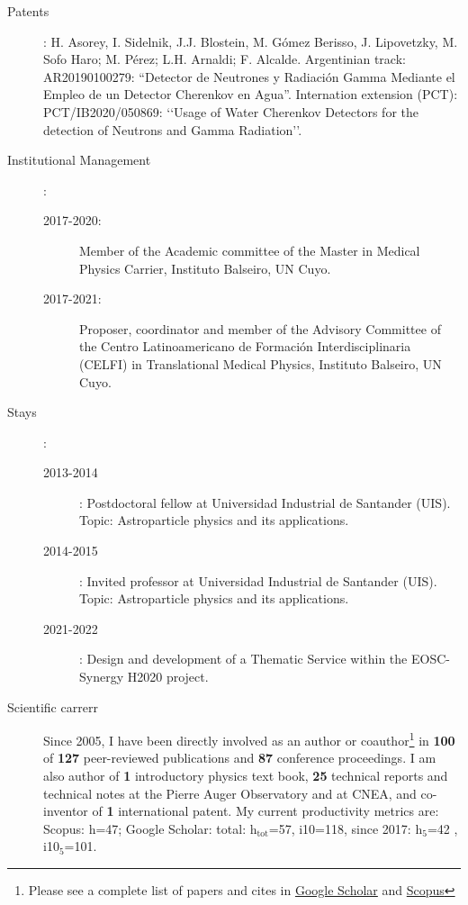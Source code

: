 \documentclass[11pt,a4paper]{article}
\begin{document}
\begin{description}
\begin{description}
    \end{description}
    \item[Patents]: H. Asorey, I. Sidelnik, J.J. Blostein, M. Gómez Berisso, J. Lipovetzky, M. Sofo Haro; M. Pérez; L.H. Arnaldi; F. Alcalde. Argentinian track: AR20190100279: “Detector de Neutrones y Radiación Gamma Mediante el Empleo de un Detector Cherenkov en Agua”. Internation extension (PCT): PCT/IB2020/050869: \lq\lq{}Usage of Water Cherenkov Detectors for the detection of Neutrons and Gamma Radiation\rq\rq{}.
    \item[Institutional Management]:
    \begin{description}
        \item [2017-2020:] Member of the Academic committee of the Master in Medical Physics Carrier, Instituto Balseiro, UN Cuyo.
        \item [2017-2021:] Proposer, coordinator and member of the Advisory Committee of the Centro Latinoamericano de Formación Interdisciplinaria (CELFI) in Translational Medical Physics, Instituto Balseiro, UN Cuyo.
    \end{description}
    \item[Stays]:
    \begin{description}
        \item[2013-2014]: Postdoctoral fellow at Universidad Industrial de Santander (UIS). Topic: Astroparticle physics and its applications.
        \item[2014-2015]: Invited professor at Universidad Industrial de Santander (UIS). Topic: Astroparticle physics and its applications.
        \item[2021-2022]: Design and development of a Thematic Service within the EOSC-Synergy H2020 project.
    \end{description}
  \item[Scientific carrerr] Since 2005, I have been directly involved as an author or coauthor\footnote{Please see a complete list of papers and cites in \href{https://scholar.google.com/citations?user=Vj7_fGsAAAAJ}{Google Scholar} and \href{https://www.scopus.com/authid/detail.url?authorId=35276880300}{Scopus}} in {\textbf{100}} of {\textbf{127}} peer-reviewed publications and {\textbf{87}} conference proceedings.
  I am also author of {\textbf{1}} introductory physics text book, {\textbf{25}} technical reports and technical notes at the Pierre Auger Observatory and at CNEA, and co-inventor of {\textbf{1}} international patent. My current productivity metrics are: Scopus: h=47; Google Scholar: total: h$_{\mathrm{tot}}$=57, i10=118, since 2017: h$_{\mathrm{5}}$=42 , i10$_\mathrm{5}$=101.
  \end{description}
\end{document}
